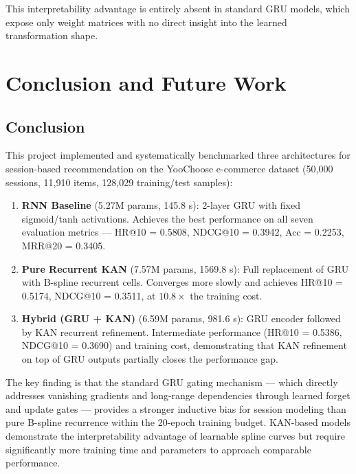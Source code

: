 \documentclass[12pt,a4paper]{report}
\begin{document}
This interpretability advantage is entirely absent in standard GRU models, which
expose only weight matrices with no direct insight into the learned transformation
shape.

\chapter{Conclusion and Future Work}

\section{Conclusion}

This project implemented and systematically benchmarked three architectures for
session-based recommendation on the YooChoose e-commerce dataset (50,000
sessions, 11,910 items, 128,029 training/test samples):

\begin{enumerate}
    \item \textbf{RNN Baseline} (5.27M params, 145.8 s): 2-layer GRU with fixed
          sigmoid/tanh activations. Achieves the best performance on all seven
          evaluation metrics --- HR@10 = 0.5808, NDCG@10 = 0.3942, Acc = 0.2253,
          MRR@20 = 0.3405.
    \item \textbf{Pure Recurrent KAN} (7.57M params, 1569.8 s): Full replacement
          of GRU with B-spline recurrent cells. Converges more slowly and achieves
          HR@10 = 0.5174, NDCG@10 = 0.3511, at $10.8\times$ the training cost.
    \item \textbf{Hybrid (GRU + KAN)} (6.59M params, 981.6 s): GRU encoder
          followed by KAN recurrent refinement. Intermediate performance (HR@10 =
          0.5386, NDCG@10 = 0.3690) and training cost, demonstrating that KAN
          refinement on top of GRU outputs partially closes the performance gap.
\end{enumerate}

The key finding is that the standard GRU gating mechanism --- which directly
addresses vanishing gradients and long-range dependencies through learned forget
and update gates --- provides a stronger inductive bias for session modeling than
pure B-spline recurrence within the 20-epoch training budget. KAN-based models
demonstrate the interpretability advantage of learnable spline curves but require
significantly more training time and parameters to approach comparable performance.
\end{document}
